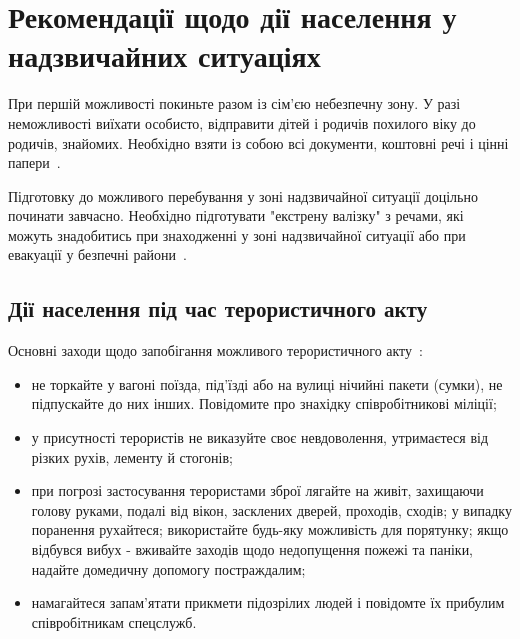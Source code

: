 







\Ukrainian

\section*{Рекомендації щодо дії населення у надзвичайних ситуаціях}

При першій можливості покиньте разом із сім’єю небезпечну зону. 
У разі неможливості виїхати особисто, відправити дітей і родичів похилого віку до родичів, знайомих. Необхідно взяти із собою всі документи, коштовні речі і цінні папери~\cite{iFrank}.

Підготовку до можливого перебування у зоні надзвичайної ситуації доцільно починати завчасно. Необхідно підготувати "екстрену валізку" з речами, які можуть знадобитись при знаходженні у зоні надзвичайної ситуації або при евакуації у безпечні райони~\cite{iFrank}.

\subsection*{Дії населення під час терористичного акту}
Основні заходи щодо запобігання можливого терористичного акту~\cite{cherkass}:
\begin{itemize}
	\item не торкайте у вагоні поїзда, під'їзді або на вулиці нічийні пакети (сумки), не підпускайте до них інших. Повідомите про знахідку співробітникові міліції;
	\item у присутності терористів не виказуйте своє невдоволення, утримаєтеся від різких рухів, лементу й стогонів;
	\item при погрозі застосування терористами зброї лягайте на живіт, захищаючи голову руками, подалі від вікон, засклених дверей, проходів, сходів; у випадку поранення рухайтеся; використайте будь-яку можливість для порятунку; якщо відбувся вибух - вживайте заходів щодо недопущення пожежі та паніки, надайте домедичну допомогу постраждалим;
	\item намагайтеся запам'ятати прикмети підозрілих людей і повідомте їх прибулим співробітникам спецслужб.
\end{itemize}

